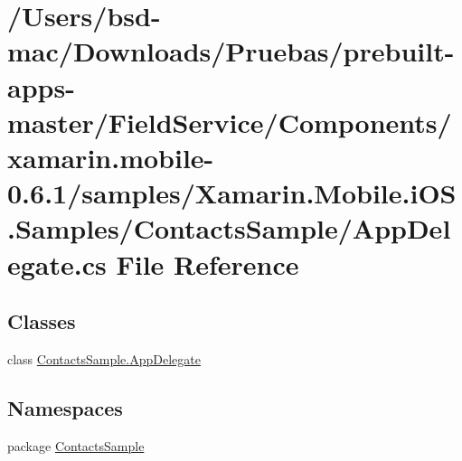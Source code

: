 \hypertarget{_components_2xamarin_8mobile-0_86_81_2samples_2_xamarin_8_mobile_8i_o_s_8_samples_2_contacts_sample_2_app_delegate_8cs}{\section{/\+Users/bsd-\/mac/\+Downloads/\+Pruebas/prebuilt-\/apps-\/master/\+Field\+Service/\+Components/xamarin.mobile-\/0.6.1/samples/\+Xamarin.Mobile.\+i\+O\+S.\+Samples/\+Contacts\+Sample/\+App\+Delegate.cs File Reference}
\label{_components_2xamarin_8mobile-0_86_81_2samples_2_xamarin_8_mobile_8i_o_s_8_samples_2_contacts_sample_2_app_delegate_8cs}
}
\subsection*{Classes}
\begin{DoxyCompactItemize}
\item 
class \hyperlink{class_contacts_sample_1_1_app_delegate}{Contacts\+Sample.\+App\+Delegate}
\end{DoxyCompactItemize}
\subsection*{Namespaces}
\begin{DoxyCompactItemize}
\item 
package \hyperlink{namespace_contacts_sample}{Contacts\+Sample}
\end{DoxyCompactItemize}
